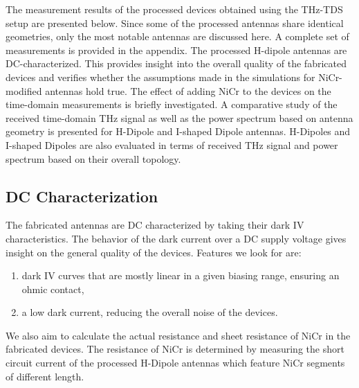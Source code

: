 The measurement results of the processed devices obtained using the THz-TDS setup are presented below. Since some of the processed antennas share identical geometries, only the most notable antennas are discussed here. A complete set of measurements is provided in the appendix. The processed H-dipole antennas are DC-characterized. This provides insight into the overall quality of the fabricated devices and verifies whether the assumptions made in the simulations for NiCr-modified antennas hold true. The effect of adding NiCr to the devices on the time-domain measurements is briefly investigated. A comparative study of the received time-domain THz signal as well as the power spectrum based on antenna geometry is presented for H-Dipole and I-shaped Dipole antennas. H-Dipoles and I-shaped Dipoles are also evaluated in terms of received THz signal and power spectrum based on their overall topology. 

\subsection{DC Characterization}


The fabricated antennas are DC characterized by taking their dark IV characteristics. The behavior of the dark current over a DC supply voltage gives insight on the general quality of the devices. Features we look for are: 
\begin{enumerate}
    \item dark IV curves that are mostly linear in a given biasing range, ensuring an ohmic contact, 
    \item a low dark current, reducing the overall noise of the devices. 
\end{enumerate}

We also aim to calculate the actual resistance and sheet resistance of NiCr in the fabricated devices. The resistance of NiCr is determined by measuring the short circuit current of the processed H-Dipole antennas which feature NiCr segments of different length. 

